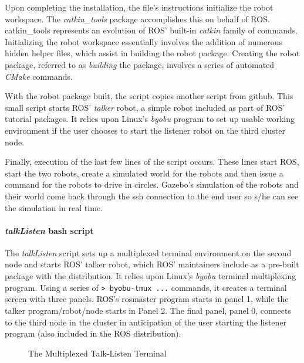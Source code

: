 \documentclass[9pt,twocolumn,twoside]{../../styles/osajnl}
\begin{document}
Upon completing the installation, the file's instructions initialize the robot workspace.  The \textit{catkin\_tools} package accomplishes this on behalf of ROS.  catkin\_tools represents an evolution of ROS' built-in \textit{catkin} family of commands.  Initializing the robot workspace essentially involves the addition of numerous hidden helper files, which assist in building the robot package.  Creating the robot package, referred to as \textit{building} the package, involves a series of automated \textit{CMake} commands.  

With the robot package built, the script copies another script from github.  This small script starts ROS' \textit{talker} robot, a simple robot included as part of ROS' tutorial packages.  It relies upon Linux's \textit{byobu} program to set up usable working environment if the user chooses to start the listener robot on the third cluster node.

Finally, execution of the last few lines of the script occurs.  These lines start ROS, start the two robots, create a simulated world for the robots and then issue a command for the robots to drive in circles.  Gazebo's simulation of the robots and their world come back through the ssh connection to the end user so s/he can see the simulation in real time. 

\paragraph{\textit{talkListen} bash script}
The \textit{talkListen} script sets up a multiplexed terminal environment on the second node and starts ROS' talker robot, which ROS' maintainers include as a pre-built package with the distribution.  It relies upon Linux's \textit{byobu} terminal multiplexing program.  Using a series of { \lstinline[style=BashInputStyle]!> byobu-tmux ...! } commands, it creates a terminal screen with three panels.  ROS's rosmaster program starts in panel 1, while the talker program/robot/node starts in Panel 2.  The final panel, panel 0, connects to the third node in the cluster in anticipation of the user starting the listener program (also included in the ROS distribution).

\begin{figure}[htbp]
\centering
{}
\caption{The Multiplexed Talk-Listen Terminal}
\label{fig:byobu}
\end{figure}
\end{document}

